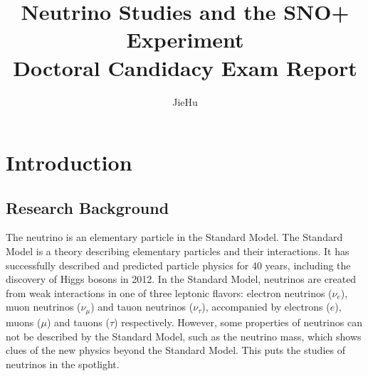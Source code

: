 \documentclass[preprint,12pt]{elsarticle}
\numberwithin{equation}{section}
\begin{document}
\begin{frontmatter}



\title{Neutrino Studies and the SNO+ Experiment\\
	Doctoral Candidacy Exam Report
	}


\author{Jie\quad Hu}

\address{Department of Physics, University of Alberta}

\end{frontmatter}


\section{Introduction}

\subsection{Research Background}
The neutrino is an elementary particle in the Standard Model. The Standard Model is a theory describing elementary particles and their interactions. It has successfully described and predicted particle physics for 40 years, including the discovery of Higgs bosons in 2012. In the Standard Model, neutrinos are created from weak interactions in one of three leptonic flavors: electron neutrinos ($\nu_e$), muon neutrinos ($\nu_\mu$) and tauon neutrinos ($\nu_\tau$), accompanied by electrons ($e$), muons ($\mu$) and tauons ($\tau$) respectively\cite{wiki_nu}. However, some properties of neutrinos can not be described by the Standard Model, such as the neutrino mass, which shows clues of the new physics beyond the Standard Model. This puts the studies of neutrinos in the spotlight.
\end{document}
